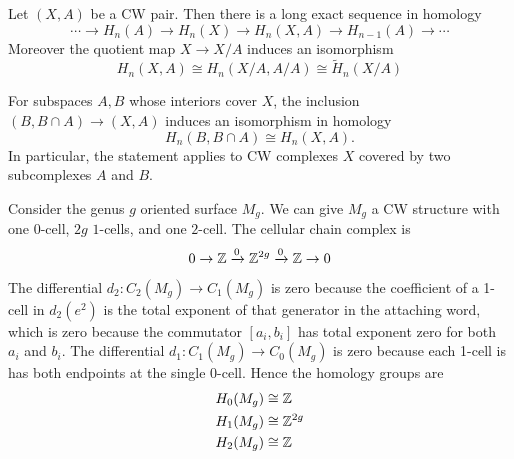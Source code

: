 \documentclass[12pt]{article}
\begin{document}
\begin{theorem}
    Let $(X,A)$ be a CW pair. Then there is a long exact sequence in homology
    \[\cdots \to H_n(A) \to H_n(X) \to H_n(X,A) \to H_{n-1}(A) \to \cdots\]
    Moreover the quotient map $X \to X/A$ induces an isomorphism \[H_n(X,A) \cong H_n(X/A,A/A) \cong \tilde{H}_n(X/A)\]
\end{theorem}

\begin{theorem}
    [Excision] For subspaces $A,B$ whose interiors cover $X$, the inclusion $(B,B\cap A) \to (X,A)$ induces an isomorphism in homology
    \[H_n(B,B\cap A) \cong H_n(X,A).
    \] In particular, the statement applies to CW complexes $X$ covered by two subcomplexes $A$ and $B$.
\end{theorem}

\begin{example}
    Consider the genus $g$ oriented surface $M_g$. We can give $M_g$ a CW structure with one $0$-cell, $2g$ $1$-cells, and one $2$-cell. The cellular chain complex is
    \[0 \to \mathbb{Z} \xrightarrow{0} \mathbb{Z}^{2g} \xrightarrow{0} \mathbb{Z} \to 0\]
    The differential $d_2:C_2(M_g) \to C_1(M_g)$ is zero because the coefficient of a 1-cell in $d_2(e^2)$ is the total exponent of that generator in the attaching word, which is zero because the commutator $[a_i,b_i]$ has total exponent zero for both $a_i$ and $b_i$. The differential $d_1:C_1(M_g) \to C_0(M_g)$ is zero because each 1-cell is has both endpoints at the single 0-cell. Hence the homology groups are
    \begin{align*}
        H_0(M_g) & \cong \mathbb{Z}      \\
        H_1(M_g) & \cong \mathbb{Z}^{2g} \\
        H_2(M_g) & \cong \mathbb{Z}
    \end{align*}
\end{example}
\end{document}

